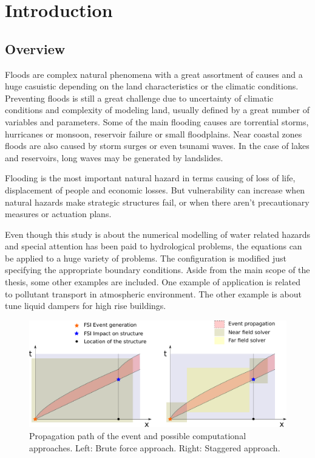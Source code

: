 
\chapter{Introduction}
\label{chapter_introduction}




\section{Overview}


Floods are complex natural phenomena with a great assortment of causes and a huge casuistic
depending on the land characteristics or the climatic conditions. Preventing floods is still a great
challenge due to uncertainty of climatic conditions and complexity of modeling land, usually
defined by a great number of variables and parameters.
Some of the main flooding causes are torrential storms, hurricanes or monsoon, reservoir failure
or small floodplains. Near coastal zones floods are also caused by storm surges or even
tsunami waves. In the case of lakes and reservoirs, long waves may be generated by landslides.

Flooding is the most important natural hazard in terms causing of loss of life, displacement of
people and economic losses. But vulnerability can
increase when natural hazards make strategic structures fail, or when there aren't precautionary
measures or actuation plans.



Even though this study is about the numerical modelling of water related hazards and special attention has been paid to hydrological problems, the equations can be applied to a huge variety of problems. The configuration is modified just specifying the appropriate boundary conditions. Aside from the main scope of the thesis, some other examples are included. One example of application is related to pollutant transport in atmospheric environment. The other example is about tune liquid dampers for high rise buildings.


\begin{figure}
    \centering
    \includegraphics[width=\textwidth]{img/coupling/space_time}
    \caption{Propagation path of the event and possible computational approaches. Left: Brute force approach. Right: Staggered approach.}
    \label{space_time_staggered_approach}
\end{figure}


